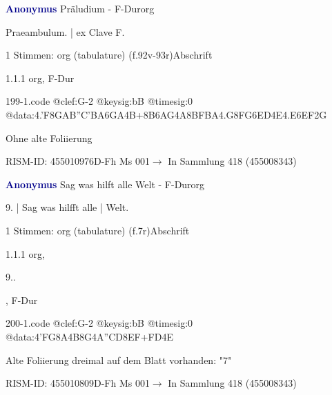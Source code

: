 \documentclass[twocolumn]{book}
\begin{document}
\par \vspace{7pt} \textcolor{darkblue}{\textbf{Anonymus  }}\hfillplus{\textbf{[199]}}\newline Präludium - F-Dur\newline org
\par \begin{itshape}[f.92v, at left:] Praeambulum. | ex Clave F.\end{itshape} 
\par \textcolor{darkblue}{}  1 Stimmen: org (tabulature)  (f.92v-93r)\newline Abschrift
\par 1.1.1  org, F-Dur  
\begin{filecontents*}{199-1.code}
@clef:G-2
@keysig:bB
@timesig:0
@data:4.'F8G{AB''C'B}{A6GA}4B+{8B6AG}4A{8BFBA}4.G8F{G6ED}4E4.E{6EF}2G
\end{filecontents*}
\newline
%
\par Ohne alte Foliierung
\par RISM-ID: 455010976\newline D-Fh  Ms 001\newline $\rightarrow$ In Sammlung 418 (455008343)
      
\par \vspace{7pt} \textcolor{darkblue}{\textbf{Anonymus  }}\hfillplus{\textbf{[200]}}\newline Sag was hilft alle Welt - F-Dur\newline org
\par \begin{itshape}[f.7r, at left:] 9. | Sag was hilfft alle | Welt.\end{itshape} 
\par \textcolor{darkblue}{}  1 Stimmen: org (tabulature)  (f.7r)\newline Abschrift
\par 1.1.1  org, \begin{itshape}9..\end{itshape}, F-Dur  
\begin{filecontents*}{200-1.code}
@clef:G-2
@keysig:bB
@timesig:0
@data:4'FG8A4B8G4A''CD{8EF+}{FD}4E
\end{filecontents*}
\newline
%
\par Alte Foliierung dreimal auf dem Blatt vorhanden: "7"
\par RISM-ID: 455010809\newline D-Fh  Ms 001\newline $\rightarrow$ In Sammlung 418 (455008343)
      
\end{document}
